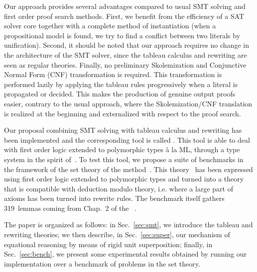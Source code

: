 Our approach provides several advantages compared to usual SMT solving and first
order proof search methods. First, we benefit from the efficiency of a SAT
solver core together with a complete method of instantiation (when a
propositional model is found, we try to find a conflict between two literals by
unification). Second, it should be noted that our approach requires no change in
the architecture of the SMT solver, since the tableau calculus and rewriting are
seen as regular theories. Finally, no preliminary Skolemization and Conjunctive
Normal Form (CNF) transformation is required. This transformation is performed
lazily by applying the tableau rules progressively when a literal is propagated
or decided. This makes the production of genuine output proofs easier, contrary
to the usual approach, where the Skolemization/CNF translation is realized at
the beginning and externalized with respect to the proof search.

Our proposal combining SMT solving with tableau calculus and rewriting has been
implemented and the corresponding tool is called \archsat{}. This tool is able
to deal with first order logic extended to polymorphic types à la ML, through a
type system in the spirit of~\cite{BP13}. To test this tool, we propose a
suite of benchmarks in the framework of the set theory of the \bmth{}
method~\cite{B-Book}. This theory~\cite{BA15} has been expressed using first
order logic extended to polymorphic types and turned into a theory that is
compatible with deduction modulo theory, i.e. where a large part of axioms has
been turned into rewrite rules. The benchmark itself gathers 319~lemmas coming
from Chap.~2 of the \bbook{}~\cite{B-Book}.

The paper is organized as follows: in Sec.~\ref{sec:smt}, we introduce the
tableau and rewriting theories; we then describe, in Sec.~\ref{sec:super}, our
mechanism of equational reasoning by means of rigid unit superposition; finally,
in Sec.~\ref{sec:bench}, we present some experimental results obtained by
running our implementation over a benchmark of problems in the \bmth{} set
theory.
